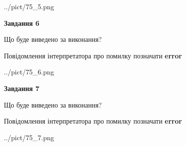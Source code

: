 \documentclass[10pt, ukrainian]{article}
\begin{document}
{\begin {large}
\begin{center}
	{../pict/75_5.png}
\end{center}
\newpage

{\begin {center}\textbf{Завдання 6}\end {center}}\par
Що буде виведено за виконання? \par
Повідомлення інтерпретатора про помилку позначати \textbf{error}

\begin{center}
	{../pict/75_6.png}
\end{center}
\newpage

{\begin {center}\textbf{Завдання 7}\end {center}}\par
Що буде виведено за виконання? \par
Повідомлення інтерпретатора про помилку позначати \textbf{error}

\begin{center}
	{../pict/75_7.png}
\end{center}
\newpage

\end {large}}
\end{document}
